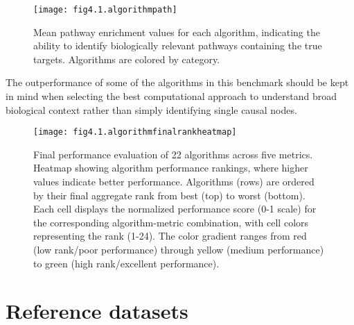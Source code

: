 \begin{figure}[htbp]
    \centering
    \texttt{[image: fig4.1.algorithmpath]}
    \caption[Mean pathway enrichment values for each algorithm.]{Mean pathway enrichment values for each algorithm, indicating the ability to identify biologically relevant pathways containing the true targets. Algorithms are colored by category.}
    \label{fig:fig4.1.algorithmpath}
\end{figure}

The outperformance of some of the algorithms in this benchmark should be kept in mind when selecting the best computational approach to understand broad biological context rather than simply identifying single causal nodes. 

\begin{figure}[htbp]
    \centering
    \texttt{[image: fig4.1.algorithmfinalrankheatmap]}
    \caption[Final performance evaluation of 22 algorithms across five metrics.]{Final performance evaluation of 22 algorithms across five metrics. Heatmap showing algorithm performance rankings, where higher values indicate better performance. Algorithms (rows) are ordered by their final aggregate rank from best (top) to worst (bottom). Each cell displays the normalized performance score (0-1 scale) for the corresponding algorithm-metric combination, with cell colors representing the rank (1-24). The color gradient ranges from red (low rank/poor performance) through yellow (medium performance) to green (high rank/excellent performance). }
    \label{fig:fig4.1.algorithmfinalrankheatmap}
\end{figure}


\section{Reference datasets} %
\label{sec:referencedatasetsresults}

